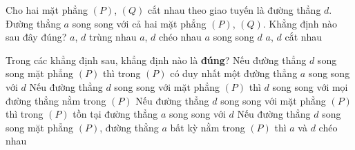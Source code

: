 \begin{ex}%
	Cho hai mặt phẳng $\left(P\right)$, $\left(Q\right)$ cắt nhau theo giao tuyến là đường thẳng $d$. Đường thẳng $a$ song song với cả hai mặt phẳng $\left(P\right)$, $\left(Q\right)$. Khẳng định nào  sau đây đúng?
	\choice 
		{$a$, $d$ trùng  nhau}
		{$a$, $d$  chéo nhau}
		 {\True $a$ song song $d$}
		{$a$,  $d$ cắt nhau}
\end{ex}

\begin{ex}%
	Trong các khẳng định sau,  khẳng định nào là \textbf{đúng}?
	\choice 
		{Nếu đường thẳng $d$ song song mặt phẳng $(P)$ thì trong $(P)$ có duy nhất một đường thẳng $a$ song song với  $d$}
		{Nếu đường thẳng $d$ song song với  mặt phẳng $(P)$ thì $d$ song song với mọi đường thẳng nằm trong $(P)$}
		{\True Nếu đường thẳng $d$ song song với mặt phẳng $(P)$ thì trong $(P)$ tồn tại  đường thẳng $a$ song song với $d$}
		{Nếu đường thẳng $d$ song song mặt phẳng $(P)$, đường thẳng  $a$ bất kỳ nằm trong $(P)$ thì $a$ và $d$ chéo nhau}
\end{ex}

